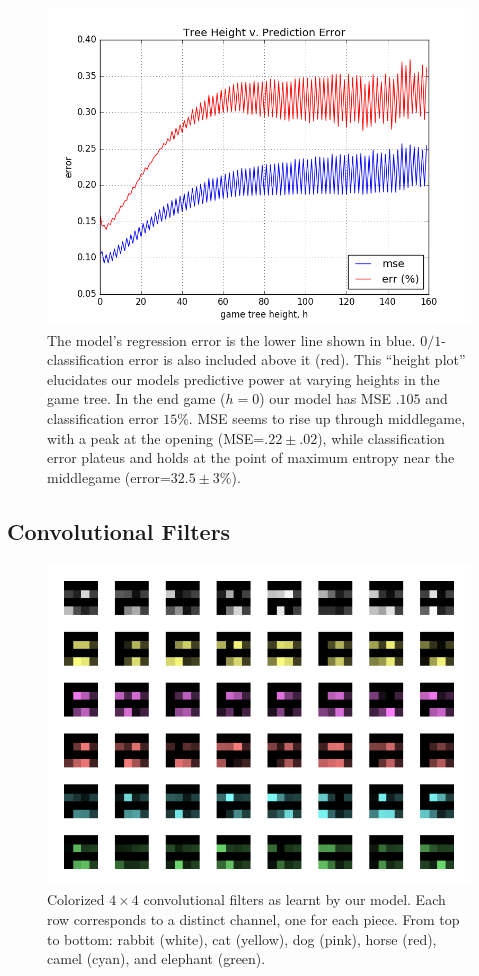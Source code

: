 \documentclass{article}
\begin{document}
\begin{figure}[ht]
\centering
\includegraphics[scale=.5]{assets/figure-hplot.png}
\caption{The model's regression error is the lower line shown in blue.  $0/1$-classification error is also included above it (red).  This ``height plot'' elucidates our models predictive power at varying heights in the game tree.  In the end game ($h=0$) our model has MSE $.105$ and classification error $15\%$.  MSE seems to rise up through middlegame, with a peak at the opening (MSE=$.22\pm .02$), while classification error plateus and holds at the point of maximum entropy near the middlegame (error=$32.5\pm 3 \%$). \label{fig:hplot}}
\end{figure}

\subsection{Convolutional Filters}

\begin{figure}[h]
\centering
\includegraphics[scale=.5]{assets/figure-filters.png}
\caption{Colorized $4\times 4$ convolutional filters as learnt by our model.  Each row corresponds to a distinct channel, one for each piece.  From top to bottom: rabbit (white), cat (yellow), dog (pink), horse (red), camel (cyan), and elephant (green). }
\end{figure}
\end{document}
